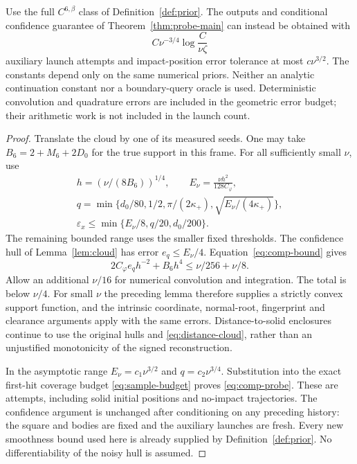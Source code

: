 \begin{theorem}\label{thm:comp-probe}
Use the full $C^{6,\beta}$ class of Definition~\ref{def:prior}. The
outputs and conditional confidence guarantee of
Theorem~\ref{thm:probe-main} can instead be obtained with
\begin{equation}\label{eq:comp-probe}
 C\nu^{-3/4}\log\frac{C}{\nu\zeta}
\end{equation}
auxiliary launch attempts and impact-position error tolerance at most
$c\nu^{3/2}$. The constants depend only on the same numerical priors.
Neither an analytic continuation constant nor a boundary-query oracle
is used. Deterministic convolution and quadrature errors are included
in the geometric error budget; their arithmetic work is not included
in the launch count.
\end{theorem}
\begin{proof}
Translate the cloud by one of its measured seeds. One may take
$B_6=2+M_6+2D_0$ for the true support in this frame. For all sufficiently
small $\nu$, use
\begin{equation}\label{eq:comp-choices}
 \begin{gathered}
 h=(\nu/(8B_6))^{1/4},\qquad
 E_\nu=\frac{\nu h^2}{128C_\varphi},\\
 q=\min\{d_0/80,1/2,\pi/(2\kappa_+),
                         \sqrt{E_\nu/(4\kappa_+)}\},\\
 \varepsilon_x\le\min\{E_\nu/8,q/20,d_0/200\}.
 \end{gathered}
\end{equation}
The remaining bounded range uses the smaller fixed thresholds. The
confidence hull of Lemma~\ref{lem:cloud} has error
$e_q\le E_\nu/4$. Equation~\eqref{eq:comp-bound} gives
\[
 2C_\varphi e_qh^{-2}+B_6h^4
                 \le\nu/256+\nu/8.
\]
Allow an additional $\nu/16$ for numerical convolution and integration.
The total is below $\nu/4$. For small $\nu$ the preceding lemma
therefore supplies a strictly convex support function, and the intrinsic
coordinate, normal-root, fingerprint and clearance arguments apply with
the same errors. Distance-to-solid enclosures continue to use the original
hulls and \eqref{eq:distance-cloud}, rather than an unjustified
monotonicity of the signed reconstruction.

In the asymptotic range $E_\nu=c_1\nu^{3/2}$ and
$q=c_2\nu^{3/4}$. Substitution into the exact first-hit coverage budget
\eqref{eq:sample-budget} proves \eqref{eq:comp-probe}. These are
attempts, including solid initial positions and no-impact trajectories.
The confidence argument is unchanged after conditioning on any preceding
history: the square and bodies are fixed and the auxiliary launches are
fresh. Every new smoothness bound used here is already supplied by
Definition~\ref{def:prior}. No differentiability of the noisy hull is
assumed.
\end{proof}

